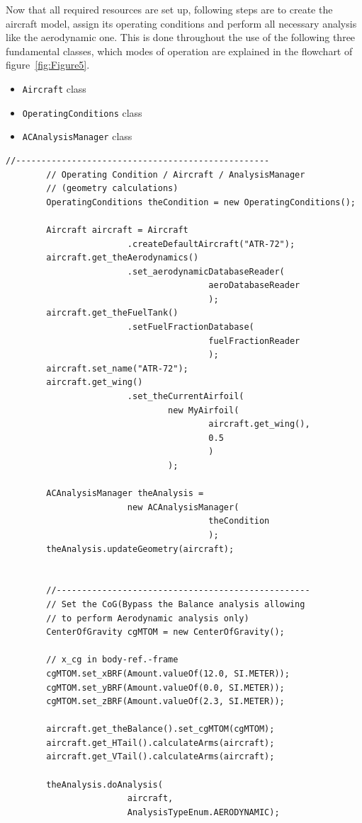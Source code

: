 \documentclass[a4paper,12pt,oneside]{book}
\begin{document}
Now that all required resources are set up, following steps are to create the aircraft model, assign its operating conditions and perform all necessary analysis like the aerodynamic one. This is done throughout the use of the following three fundamental classes, which modes of operation are explained in the flowchart of figure~\ref{fig:Figure5}.

\begin{itemize}
\item\lstinline[language=Java]!Aircraft! class
\item\lstinline[language=Java]!OperatingConditions! class
\item\lstinline[language=Java]!ACAnalysisManager! class
\end{itemize}

\begin{lstlisting}[caption={Excerpt of the ATR-72 Payload-Range test - Aircraft, OperatingConditions and ACAnalysisManager setup}, captionpos=b, tabsize=2]
		//--------------------------------------------------
		// Operating Condition / Aircraft / AnalysisManager 
		// (geometry calculations)
		OperatingConditions theCondition = new OperatingConditions();
		
		Aircraft aircraft = Aircraft
						.createDefaultAircraft("ATR-72");
		aircraft.get_theAerodynamics()
						.set_aerodynamicDatabaseReader(
										aeroDatabaseReader
										);
		aircraft.get_theFuelTank()
						.setFuelFractionDatabase(
										fuelFractionReader
										);
		aircraft.set_name("ATR-72");
		aircraft.get_wing()
						.set_theCurrentAirfoil(
								new MyAirfoil(
										aircraft.get_wing(), 
										0.5
										)
								);		
		
		ACAnalysisManager theAnalysis = 
						new ACAnalysisManager(
										theCondition
										);
		theAnalysis.updateGeometry(aircraft);
		
		
		//--------------------------------------------------
		// Set the CoG(Bypass the Balance analysis allowing
		// to perform Aerodynamic analysis only)
		CenterOfGravity cgMTOM = new CenterOfGravity();

		// x_cg in body-ref.-frame
		cgMTOM.set_xBRF(Amount.valueOf(12.0, SI.METER)); 
		cgMTOM.set_yBRF(Amount.valueOf(0.0, SI.METER));
		cgMTOM.set_zBRF(Amount.valueOf(2.3, SI.METER));

		aircraft.get_theBalance().set_cgMTOM(cgMTOM);
		aircraft.get_HTail().calculateArms(aircraft);
		aircraft.get_VTail().calculateArms(aircraft);
		
		theAnalysis.doAnalysis(
						aircraft, 
						AnalysisTypeEnum.AERODYNAMIC);
\end{lstlisting}
\end{document}
